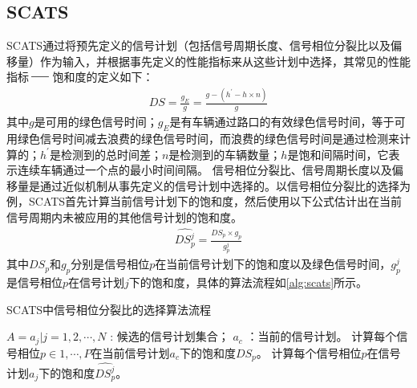 \subsection{SCATS}
SCATS\cite{lowrie1990scats}通过将预先定义的信号计划（包括信号周期长度、信号相位分裂比以及偏移量）作为输入，并根据事先定义的性能指标来从这些计划中选择，其常见的性能指标$\cndash$饱和度的定义如下：
\begin{align}
    D S=\frac{g_E}{g}=\frac{g-\left(h^{\prime}-h \times n\right)}{g}
\end{align}
其中$g$是可用的绿色信号时间；$g_E$是有车辆通过路口的有效绿色信号时间，等于可用绿色信号时间减去浪费的绿色信号时间，而浪费的绿色信号时间是通过检测来计算的；$h^{\prime}$是检测到的总时间差；$n$是检测到的车辆数量；$h$是饱和间隔时间，它表示连续车辆通过一个点的最小时间间隔。
信号相位分裂比、信号周期长度以及偏移量是通过近似机制从事先定义的信号计划中选择的。以信号相位分裂比的选择为例，SCATS首先计算当前信号计划下的饱和度，然后使用以下公式估计出在当前信号周期内未被应用的其他信号计划的饱和度。
\begin{align}
    \hat{D S^j_p} = \frac{D S_p \times g_p}{g_p^j}
\end{align}
其中$D S_p\text{和} g_p$分别是信号相位$p$在当前信号计划下的饱和度以及绿色信号时间，$g^j_p$是信号相位$p$在信号计划$j$下的饱和度，具体的算法流程如\autoref{alg:scats}所示。
\begin{breakablealgorithm}
    \caption{SCATS中信号相位分裂比的选择算法流程}
    \label{alg:scats}
    \begin{algorithmic}[1] %
        \Require 
        $A={a_j|j=1,2,\cdots,N}$ : 候选的信号计划集合；
        $a_c$ ：当前的信号计划。 
            \State 计算每个信号相位$p\in{1,\cdots, P}$在当前信号计划$a_c$下的饱和度$D S_{p}$。
        \EndFor
            \State 计算每个信号相位$p$在信号计划$a_j$下的饱和度$\hat{D S^j_p}$。
        \EndFor
    \end{algorithmic}  
\end{breakablealgorithm}  

